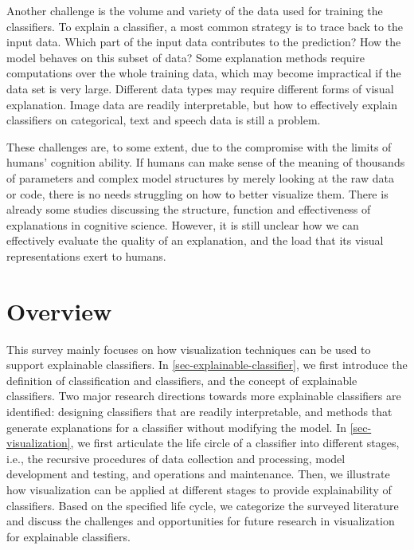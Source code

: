 Another challenge is the volume and variety of the data used for training the classifiers. To explain a classifier, a most common strategy is to trace back to the input data. Which part of the input data contributes to the prediction? How the model behaves on this subset of data? Some explanation methods require computations over the whole training data, which may become impractical if the data set is very large. Different data types may require different forms of visual explanation. Image data are readily interpretable, but how to effectively explain classifiers on categorical, text and speech data is still a problem.

These challenges are, to some extent, due to the compromise with the limits of humans' cognition ability. If humans can make sense of the meaning of thousands of parameters and complex model structures by merely looking at the raw data or code, there is no needs struggling on how to better visualize them. There is already some studies discussing the structure, function and effectiveness of explanations in cognitive science. However, it is still unclear how we can effectively evaluate the quality of an explanation, and the load that its visual representations exert to humans.


\section{Overview}

This survey mainly focuses on how visualization techniques can be used to support explainable classifiers. In \autoref{sec-explainable-classifier}, we first introduce the definition of classification and classifiers, and the concept of explainable classifiers. Two major research directions towards more explainable classifiers are identified: designing classifiers that are readily interpretable, and methods that generate explanations for a classifier without modifying the model. In \autoref{sec-visualization}, we first articulate the life circle of a classifier into different stages, i.e., the recursive procedures of data collection and processing, model development and testing, and operations and maintenance. Then, we illustrate how visualization can be applied at different stages to provide explainability of classifiers. Based on the specified life cycle, we categorize the surveyed literature and discuss the challenges and opportunities for future research in visualization for explainable classifiers.

\newpage
